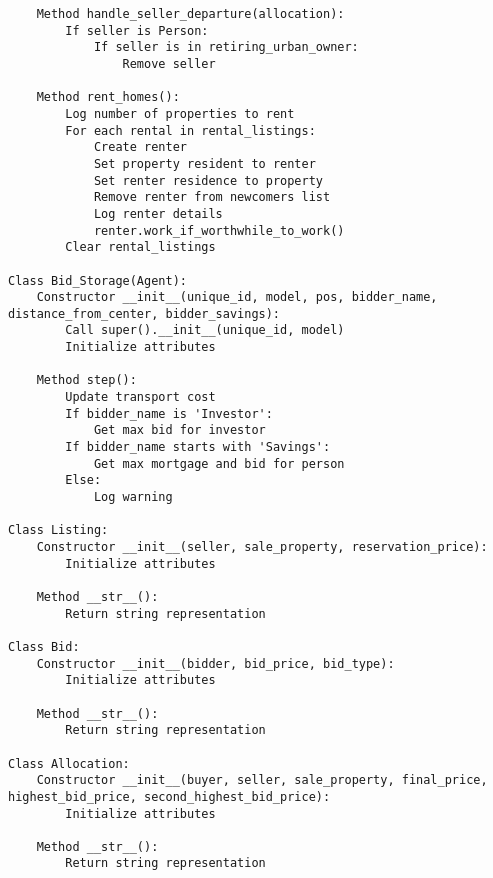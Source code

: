 {\begin{verbatim}
    Method handle_seller_departure(allocation):
        If seller is Person:
            If seller is in retiring_urban_owner:
                Remove seller

    Method rent_homes():
        Log number of properties to rent
        For each rental in rental_listings:
            Create renter
            Set property resident to renter
            Set renter residence to property
            Remove renter from newcomers list
            Log renter details
            renter.work_if_worthwhile_to_work()
        Clear rental_listings

Class Bid_Storage(Agent):
    Constructor __init__(unique_id, model, pos, bidder_name, distance_from_center, bidder_savings):
        Call super().__init__(unique_id, model)
        Initialize attributes

    Method step():
        Update transport cost
        If bidder_name is 'Investor':
            Get max bid for investor
        If bidder_name starts with 'Savings':
            Get max mortgage and bid for person
        Else:
            Log warning

Class Listing:
    Constructor __init__(seller, sale_property, reservation_price):
        Initialize attributes

    Method __str__():
        Return string representation

Class Bid:
    Constructor __init__(bidder, bid_price, bid_type):
        Initialize attributes

    Method __str__():
        Return string representation

Class Allocation:
    Constructor __init__(buyer, seller, sale_property, final_price, highest_bid_price, second_highest_bid_price):
        Initialize attributes

    Method __str__():
        Return string representation

\end{verbatim} }